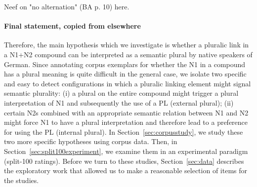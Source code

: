 Neef on "no alternation" (BA p. 10) here.

\paragraph{Final statement, copied from elsewhere}

Therefore, the main hypothesis which we investigate is whether a pluralic link in a N1+N2 compound can be interpreted as a semantic plural by native speakers of German.
Since annotating corpus exemplars for whether the N1 in a compound has a plural meaning is quite difficult in the general case, we isolate two specific and easy to detect configurations in which a pluralic linking element might signal semantic plurality:
(i) a plural on the entire compound might trigger a plural interpretation of N1 and subsequently the use of a PL (external plural);
(ii) certain N2s combined with an appropriate semantic relation between N1 and N2 might force N1 to have a plural interpretation and therefore lead to a preference for using the PL (internal plural).
In Section~\ref{sec:corpusstudy}, we study these two more specific hypotheses using corpus data.
Then, in Section~\ref{sec:split100experiment}, we examine them in an experimental paradigm (split-100 ratings).
Before we turn to these studies, Section~\ref{sec:data} describes the exploratory work that allowed us to make a reasonable selection of items for the studies.
